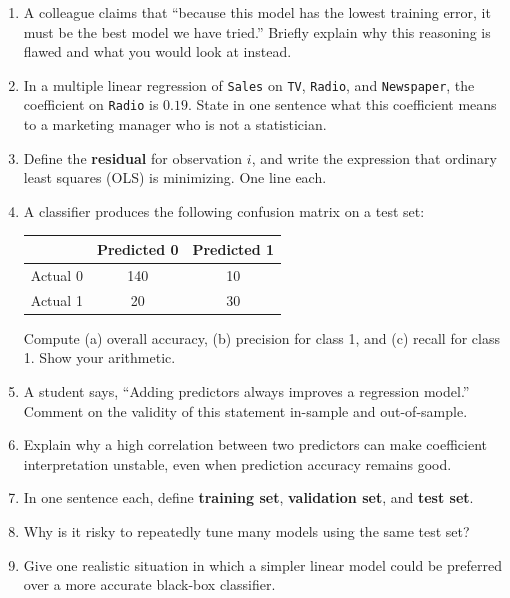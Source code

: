 \documentclass[11pt]{article}
\begin{document}
\begin{enumerate}[leftmargin=*]

\item A colleague claims that ``because this model has the lowest training error, it must be the best model we have tried.'' Briefly explain why this reasoning is flawed and what you would look at instead.

\item In a multiple linear regression of \texttt{Sales} on \texttt{TV}, \texttt{Radio}, and \texttt{Newspaper}, the coefficient on \texttt{Radio} is $0.19$. State in one sentence what this coefficient means to a marketing manager who is not a statistician.

\item Define the \textbf{residual} for observation $i$, and write the expression that ordinary least squares (OLS) is minimizing. One line each.

\item A classifier produces the following confusion matrix on a test set:
\begin{center}
\begin{tabular}{l|cc}
 & Predicted 0 & Predicted 1 \\\hline
Actual 0 & 140 & 10 \\
Actual 1 & 20 & 30 \\
\end{tabular}
\end{center}
Compute (a) overall accuracy, (b) precision for class 1, and (c) recall for class 1. Show your arithmetic.

\item A student says, ``Adding predictors always improves a regression model.'' Comment on the validity of this statement in-sample and out-of-sample.

\item Explain why a high correlation between two predictors can make coefficient interpretation unstable, even when prediction accuracy remains good.

\item In one sentence each, define \textbf{training set}, \textbf{validation set}, and \textbf{test set}.

\item Why is it risky to repeatedly tune many models using the same test set?

\item Give one realistic situation in which a simpler linear model could be preferred over a more accurate black-box classifier.


\end{enumerate}
\end{document}
